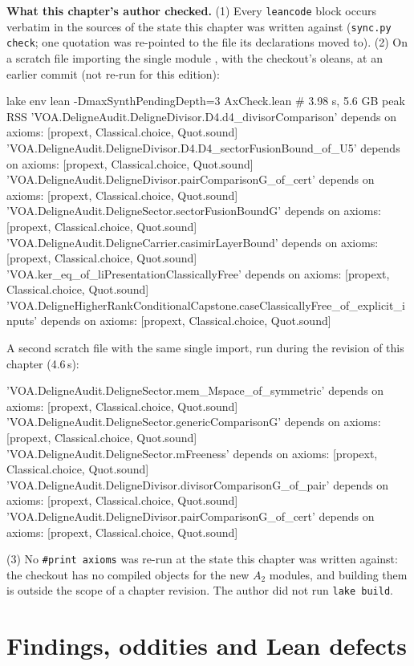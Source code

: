 \textbf{What this chapter's author checked.} (1) Every \texttt{leancode} block occurs verbatim in the sources of
the state this chapter was written against (\texttt{sync.py check}; one quotation was re-pointed to the file its declarations moved to). (2) On a
scratch file importing the single module , with the checkout's oleans, at an
earlier commit (not re-run for this edition):
\begin{plaincode}
lake env lean -DmaxSynthPendingDepth=3 AxCheck.lean     # 3.98 s, 5.6 GB peak RSS
'VOA.DeligneAudit.DeligneDivisor.D4.d4_divisorComparison' depends on axioms: [propext, Classical.choice, Quot.sound]
'VOA.DeligneAudit.DeligneDivisor.D4.D4_sectorFusionBound_of_U5' depends on axioms: [propext, Classical.choice, Quot.sound]
'VOA.DeligneAudit.DeligneDivisor.pairComparisonG_of_cert' depends on axioms: [propext, Classical.choice, Quot.sound]
'VOA.DeligneAudit.DeligneSector.sectorFusionBoundG' depends on axioms: [propext, Classical.choice, Quot.sound]
'VOA.DeligneAudit.DeligneCarrier.casimirLayerBound' depends on axioms: [propext, Classical.choice, Quot.sound]
'VOA.ker_eq_of_liPresentationClassicallyFree' depends on axioms: [propext, Classical.choice, Quot.sound]
'VOA.DeligneHigherRankConditionalCapstone.caseClassicallyFree_of_explicit_inputs' depends on axioms: [propext, Classical.choice, Quot.sound]
\end{plaincode}
A second scratch file with the same single import, run during the revision of this chapter (4.6\,s):
\begin{plaincode}
'VOA.DeligneAudit.DeligneSector.mem_Mspace_of_symmetric' depends on axioms: [propext, Classical.choice, Quot.sound]
'VOA.DeligneAudit.DeligneSector.genericComparisonG' depends on axioms: [propext, Classical.choice, Quot.sound]
'VOA.DeligneAudit.DeligneSector.mFreeness' depends on axioms: [propext, Classical.choice, Quot.sound]
'VOA.DeligneAudit.DeligneDivisor.divisorComparisonG_of_pair' depends on axioms: [propext, Classical.choice, Quot.sound]
'VOA.DeligneAudit.DeligneDivisor.pairComparisonG_of_cert' depends on axioms: [propext, Classical.choice, Quot.sound]
\end{plaincode}
(3) No \texttt{\#print axioms} was re-run at the state this chapter was written against: the checkout has no compiled objects for the new
$A_2$ modules, and building them is outside the scope of a chapter revision. The author did not run \texttt{lake build}.

\section{Findings, oddities and Lean defects}\label{l24:sec:defects}

